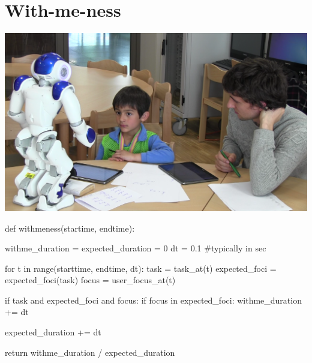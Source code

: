 \documentclass[compress]{beamer}
\begin{document}
\section{With-me-ness}

\begin{frame}[plain]{}
    \begin{center}
        \includegraphics[width=0.8\linewidth]{realSetup}

    \end{center}
\end{frame}

\begin{frame}[fragile]{}
\begin{pythoncode}

def withmeness(startime, endtime):

    withme_duration = expected_duration = 0
    dt = 0.1 #typically in sec

    for t in range(starttime, endtime, dt):
        task = task_at(t)
        expected_foci = expected_foci(task)
        focus = user_focus_at(t)

        if task and expected_foci and focus:
            if focus in expected_foci:
                withme_duration += dt

            expected_duration += dt

    return withme_duration / expected_duration

\end{pythoncode}

\end{frame}
\end{document}
